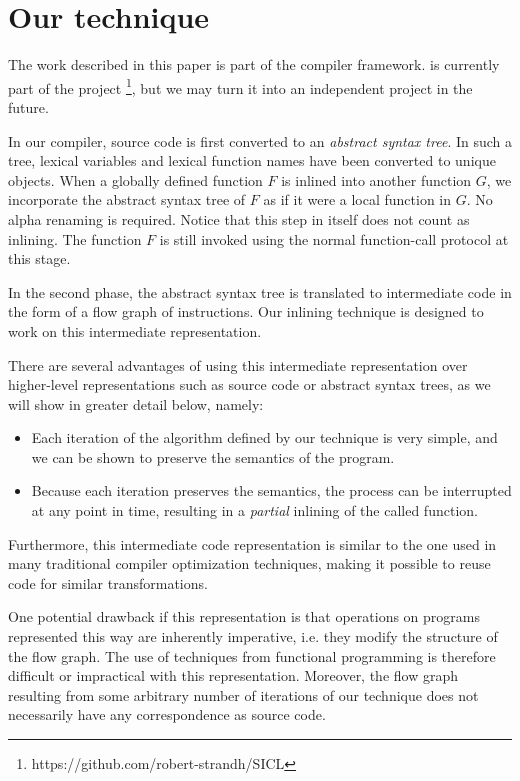 \section{Our technique}

The work described in this paper is part of the \cleavir{} compiler
framework.  \cleavir{} is currently part of the \sicl{} project%
\footnote{https://github.com/robert-strandh/SICL}, but we may turn it
into an independent project in the future.

In our compiler, source code is first converted to an \emph{abstract
  syntax tree}.  In such a tree, lexical variables and lexical
function names have been converted to unique objects.  When a globally
defined function $F$ is inlined into another function $G$, we
incorporate the abstract syntax tree of $F$ as if it were a local
function in $G$.  No alpha renaming is required.  Notice that this
step in itself does not count as inlining.  The function $F$ is still
invoked using the normal function-call protocol at this stage.

In the second phase, the abstract syntax tree is translated to
intermediate code in the form of a flow graph of instructions.  Our
inlining technique is designed to work on this intermediate
representation.

There are several advantages of using this intermediate representation
over higher-level representations such as source code or abstract
syntax trees, as we will show in greater detail below, namely:

\begin{itemize}
\item Each iteration of the algorithm defined by our technique is very
  simple, and we can be shown to preserve the semantics of the
  program.
\item Because each iteration preserves the semantics, the process can
  be interrupted at any point in time, resulting in a \emph{partial}
  inlining of the called function.
\end{itemize}

Furthermore, this intermediate code representation is similar to the
one used in many traditional compiler optimization techniques, making
it possible to reuse code for similar transformations.

One potential drawback if this representation is that operations on
programs represented this way are inherently imperative, i.e. they
modify the structure of the flow graph.  The use of techniques from
functional programming is therefore difficult or impractical with this
representation.  Moreover, the flow graph resulting from some
arbitrary number of iterations of our technique does not necessarily
have any correspondence as \commonlisp{} source code.

